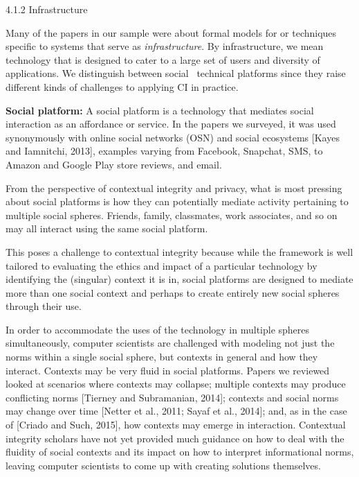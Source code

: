 \documentclass[../thesis.tex]{subfiles}
\begin{document}
{\color[rgb]{0.4,0.4,0.4}
4.1.2 Infrastructure}

Many of the papers in our sample were about formal models for or
techniques specific to systems that serve as \textit{infrastructure}.
By infrastructure, we mean technology that is designed to cater to a
large set of users and diversity of applications. We distinguish
between social \ technical platforms since they raise different kinds
of challenges to applying CI in practice.


\bigskip

\textbf{Social platform: }A social platform is a technology that
mediates social interaction as an affordance or service. In the papers
we surveyed, it was used synonymously with online social networks (OSN)
and social ecosystems [Kayes and Iamnitchi, 2013], examples varying
from Facebook, Snapchat, SMS, to Amazon and Google Play store reviews,
and email.


\bigskip

From the perspective of contextual integrity and privacy, what is most
pressing about social platforms is how they can potentially mediate
activity pertaining to multiple social spheres. Friends, family,
classmates, work associates, and so on may all interact using the same
social platform.


\bigskip

This poses a challenge to contextual integrity because while the
framework is well tailored to evaluating the ethics and impact of a
particular technology by identifying the (singular) context it is in,
social platforms are designed to mediate more than one social context
and perhaps to create entirely new social spheres through their use.


\bigskip

In order to accommodate the uses of the technology in multiple spheres
simultaneously, computer scientists are challenged with modeling not
just the norms within a single social sphere, but contexts in general
and how they interact. Contexts may be very fluid in social platforms.
Papers we reviewed looked at scenarios where contexts may collapse;
multiple contexts may produce conflicting norms [Tierney and
Subramanian, 2014]; contexts and social norms may change over time
[Netter et al., 2011; Sayaf et al., 2014]; and, as in the case of
[Criado and Such, 2015], how contexts may emerge in interaction.
Contextual integrity scholars have not yet provided much guidance on
how to deal with the fluidity of social contexts and its impact on how
to interpret informational norms, leaving computer scientists to come
up with creating solutions themselves.
\end{document}
